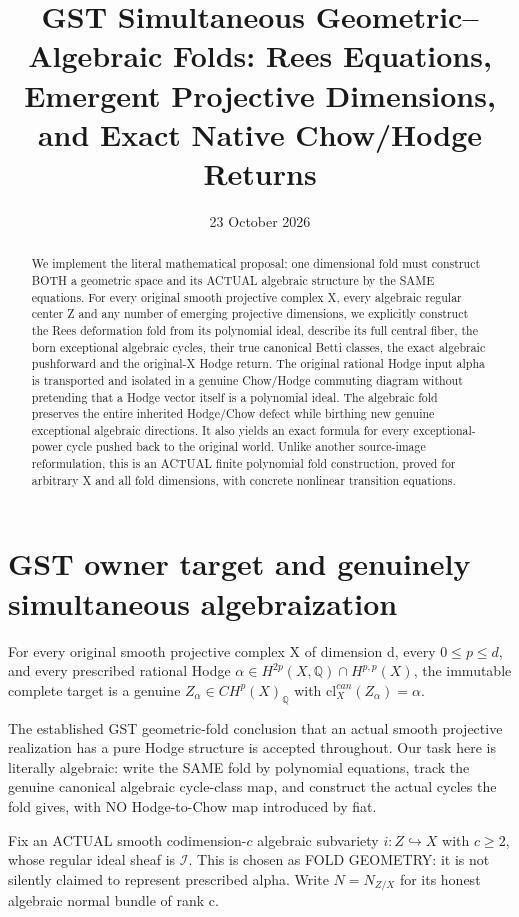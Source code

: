 \documentclass[11pt]{article}
\title{GST Simultaneous Geometric--Algebraic Folds: Rees Equations, Emergent Projective Dimensions, and Exact Native Chow/Hodge Returns}
\date{23 October 2026}
\begin{document}
\maketitle

\begin{abstract}
We implement the literal mathematical proposal: one dimensional fold
must construct BOTH a geometric space and its ACTUAL algebraic structure
by the SAME equations. For every original smooth projective complex X,
every algebraic regular center Z and any number of emerging projective
dimensions, we explicitly construct the Rees deformation fold from its
polynomial ideal, describe its full central fiber, the born exceptional
algebraic cycles, their true canonical Betti classes, the exact algebraic
pushforward and the original-X Hodge return. The original rational
Hodge input alpha is transported and isolated in a genuine Chow/Hodge
commuting diagram without pretending that a Hodge vector itself is a
polynomial ideal. The algebraic fold preserves the entire inherited
Hodge/Chow defect while birthing new genuine exceptional algebraic
directions. It also yields an exact formula for every exceptional-power
cycle pushed back to the original world. Unlike another source-image
reformulation, this is an ACTUAL finite polynomial fold construction,
proved for arbitrary X and all fold dimensions, with concrete
nonlinear transition equations.
\end{abstract}

\section{GST owner target and genuinely simultaneous algebraization}
For every original smooth projective complex X of dimension d,
every $0\le p\le d$, and every prescribed rational Hodge
$\alpha\in H^{2p}(X,\mathbb Q)\cap H^{p,p}(X)$,
the immutable complete target is a genuine
$Z_\alpha\in CH^p(X)_\mathbb Q$
with $\mathrm{cl}^{can}_X(Z_\alpha)=\alpha$.

The established GST geometric-fold conclusion that an actual
smooth projective realization has a pure Hodge structure is
accepted throughout. Our task here is literally algebraic:
write the SAME fold by polynomial equations, track the
genuine canonical algebraic cycle-class map, and construct
the actual cycles the fold gives, with NO Hodge-to-Chow
map introduced by fiat.

Fix an ACTUAL smooth codimension-$c$ algebraic subvariety
$i:Z\hookrightarrow X$ with $c\ge2$, whose regular ideal
sheaf is $\mathcal I$. This is chosen as FOLD GEOMETRY:
it is not silently claimed to represent prescribed alpha.
Write $N=N_{Z/X}$ for its honest algebraic normal bundle
of rank c.
\end{document}
